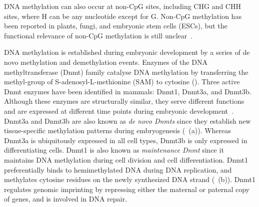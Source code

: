 DNA methylation can also occur at non-CpG sites, including CHG and CHH sites, where H can be any nucleotide except for G. Non-CpG methylation has been reported in plants, fungi, and embryonic stem cells (ESCs), but the functional relevance of non-CpG methylation is still unclear~\citep{jones_functions_2012,ziller_genomic_2011,ramsahoye_non-cpg_2000,shirane_mouse_2013}.

DNA methylation is established during embryonic development by a series of de novo methylation and demethylation events. Enzymes of the DNA methyltransferase (Dnmt) family catalyse DNA methylation by transferring the methyl-group of S-adenosyl-L-methionine (SAM) to cytosine (). Three active Dnmt enzymes have been identified in mammals: Dnmt1, Dnmt3a, and Dnmt3b. Although these enzymes are structurally similar, they serve different functions and are expressed at different time points during embryonic development~\citep{moore_dna_2013,jones_rethinking_2009,bestor_notes_2015}. Dnmt3a and Dnmt3b are also known as \emph{de novo Dnmts} since they establish new tissue-specific methylation patterns during embryogenesis (~(a)). Whereas Dnmt3a is ubiquitously expressed in all cell types, Dnmt3b is only expressed in differentiating cells. Dnmt1 is also known as \emph{maintenance Dnmt} since it maintains DNA methylation during cell division and cell differentiation. Dnmt1 preferentially binds to hemimethylated DNA during DNA replication, and methylates cytosine residues on the newly synthesized DNA strand (~(b)). Dnmt1 regulates genomic imprinting by repressing either the maternal or paternal copy of genes, and is involved in DNA repair.

